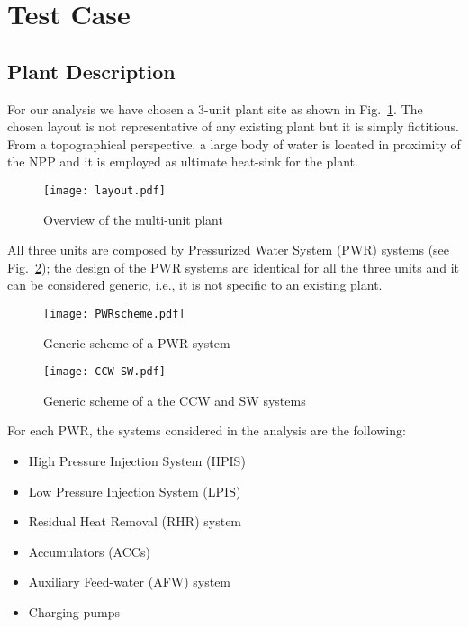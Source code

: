 \section{Test Case}
\label{sec:testCase}

\subsection{Plant Description}
For our analysis we have chosen a 3-unit plant site as shown in Fig.~\ref{fig:layout}. The chosen layout 
is not representative of any existing plant but it is simply fictitious.
From a topographical perspective, a large body of water is located in proximity of the NPP and it is 
employed as ultimate heat-sink for the plant.

\begin{figure}
    \centering
    \texttt{[image: layout.pdf]}
    \caption{Overview of the multi-unit plant}
    \label{fig:layout}
\end{figure}

All three units are composed by Pressurized Water System (PWR) systems (see Fig.~\ref{fig:PWRscheme}); 
the design of the PWR systems are identical for all the three units and it 
can be considered generic, i.e., it is not specific to an existing plant. 

\begin{figure}
    \centering
    \texttt{[image: PWRscheme.pdf]}
    \caption{Generic scheme of a PWR system}
    \label{fig:PWRscheme}
\end{figure}

\begin{figure}
    \centering
    \texttt{[image: CCW-SW.pdf]}
    \caption{Generic scheme of a the CCW and SW systems}
    \label{fig:CCW-SWscheme}
\end{figure}

For each PWR, the systems considered in the analysis are the following:
\begin{itemize}
  \item High Pressure Injection System (HPIS)
  \item Low Pressure Injection System (LPIS)
  \item Residual Heat Removal (RHR) system
  \item Accumulators (ACCs)
  \item Auxiliary Feed-water (AFW) system 
  \item Charging pumps
\end{itemize}

